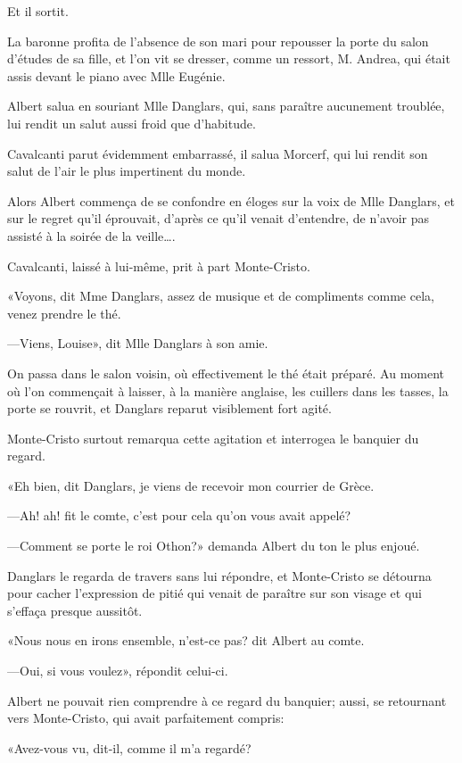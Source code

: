 Et il sortit. 

La baronne profita de l'absence de son mari pour repousser la porte du salon d'études de sa fille, et l'on vit se dresser, comme un ressort, M. Andrea, qui était assis devant le piano avec Mlle Eugénie. 

Albert salua en souriant Mlle Danglars, qui, sans paraître aucunement troublée, lui rendit un salut aussi froid que d'habitude. 

Cavalcanti parut évidemment embarrassé, il salua Morcerf, qui lui rendit son salut de l'air le plus impertinent du monde. 

Alors Albert commença de se confondre en éloges sur la voix de Mlle Danglars, et sur le regret qu'il éprouvait, d'après ce qu'il venait d'entendre, de n'avoir pas assisté à la soirée de la veille\dots. 

Cavalcanti, laissé à lui-même, prit à part Monte-Cristo. 

«Voyons, dit Mme Danglars, assez de musique et de compliments comme cela, venez prendre le thé. 

—Viens, Louise», dit Mlle Danglars à son amie. 

On passa dans le salon voisin, où effectivement le thé était préparé. Au moment où l'on commençait à laisser, à la manière anglaise, les cuillers dans les tasses, la porte se rouvrit, et Danglars reparut visiblement fort agité. 

Monte-Cristo surtout remarqua cette agitation et interrogea le banquier du regard. 

«Eh bien, dit Danglars, je viens de recevoir mon courrier de Grèce. 

—Ah! ah! fit le comte, c'est pour cela qu'on vous avait appelé? 

—Comment se porte le roi Othon?» demanda Albert du ton le plus enjoué. 

Danglars le regarda de travers sans lui répondre, et Monte-Cristo se détourna pour cacher l'expression de pitié qui venait de paraître sur son visage et qui s'effaça presque aussitôt. 

«Nous nous en irons ensemble, n'est-ce pas? dit Albert au comte. 

—Oui, si vous voulez», répondit celui-ci. 

Albert ne pouvait rien comprendre à ce regard du banquier; aussi, se retournant vers Monte-Cristo, qui avait parfaitement compris: 

«Avez-vous vu, dit-il, comme il m'a regardé? 

